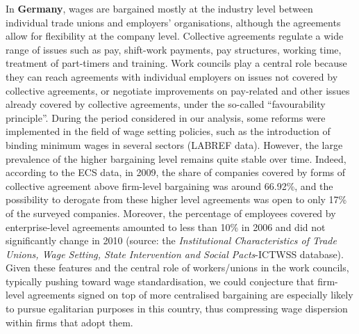 \documentclass[12pt]{article}
\begin{document}

In \textbf{Germany}, wages are bargained mostly at the industry level between individual trade unions and employers' organisations, although the agreements allow for flexibility at the company level. Collective agreements regulate a wide range of issues such as pay, shift-work payments, pay structures, working time, treatment of part-timers and training. Work councils play a central role because they can reach agreements with individual employers on issues not covered by collective agreements, or negotiate improvements on pay-related and other issues already covered by collective agreements, under the so-called “favourability principle”.
During the period considered in our analysis, some reforms were implemented in the field of wage setting policies, such as the introduction of binding minimum wages in several sectors (LABREF data). However, the large prevalence of the higher bargaining level remains quite stable over time. Indeed, according to the ECS data, in 2009, the share of companies covered by forms of collective agreement above firm-level bargaining was around 66.92\%, and the possibility to derogate from these higher level agreements was open to only 17\% of the surveyed companies. Moreover, the percentage of employees covered by enterprise-level agreements amounted to less than 10\% in 2006 and did not significantly change in 2010 (source: the \textit{Institutional Characteristics of Trade Unions, Wage Setting, State Intervention and Social Pacts}-ICTWSS database). Given these features and the central role of workers/unions in the work councils, typically pushing toward wage standardisation, we could conjecture that firm-level agreements signed on top of more centralised bargaining are especially likely to pursue egalitarian purposes in this country, thus compressing wage dispersion within firms that adopt them.
\end{document}
